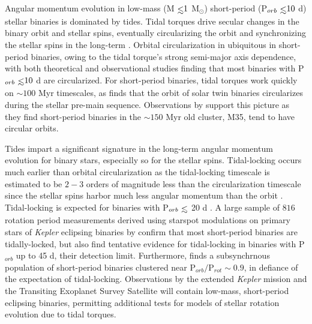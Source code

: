 \documentclass[twocolumn]{aastex61}
\def\lsim{~\rlap{$<$}{\lower 1.0ex\hbox{$\sim$}}}
\newcommand{\kepler}[0]{\textit{Kepler}\xspace}
\begin{document}
Angular momentum evolution in low-mass (M$\lsim 1$ M$_{\odot}$) short-period (P$_{orb} \lsim 10$ d) stellar binaries is dominated by tides.  Tidal torques drive secular changes in the binary orbit and stellar spins, eventually circularizing the orbit and synchronizing the stellar spins in the long-term \citep{Counselman1973}. Orbital circularization in ubiquitous in short-period binaries, owing to the tidal torque's strong semi-major axis dependence, with both theoretical \citep[e.g.][]{Zahn1989} and observational \citep[e.g.][]{Meibom2005,Mazeh2008,Lurie2017} studies finding that most binaries with P$_{orb} \lsim 10$ d are circularized. For short-period binaries, tidal torques work quickly on ${\sim}100$ Myr timescales, as \citet{Zahn1989} finds that the orbit of solar twin binaries circularizes during the stellar pre-main sequence.  Observations by \citet{Meibom2005} support this picture as they find short-period binaries in the ${\sim}150$ Myr old cluster, M35, tend to have circular orbits.

Tides impart a significant signature in the long-term angular momentum evolution for binary stars, especially so for the stellar spins. Tidal-locking occurs much earlier than orbital circularization as the tidal-locking timescale is estimated to be $2-3$ orders of magnitude less than the circularization timescale since the stellar spins harbor much less angular momentum than the orbit \citep{Zahn1989,Witte2002,Mazeh2008}. Tidal-locking is expected for binaries with P$_{orb} \lsim$ 20 d \citep[e.g.][]{Meibom2006,Mazeh2008,Zahn2008,Meibom2015}. A large sample of $816$ rotation period measurements derived using starspot modulations on primary stars of \kepler eclipsing binaries by \citet{Lurie2017} confirm that most short-period binaries are tidally-locked, but also find tentative evidence for tidal-locking in binaries with P$_{orb}$ up to 45 d, their detection limit. Furthermore, \citet{Lurie2017} finds a subsynchrnous population of short-period binaries clustered near P$_{orb}/$P$_{rot}{\sim} 0.9$, in defiance of the expectation of tidal-locking.  Observations by the extended \kepler mission \citep[K2,][]{Howell2014} and the Transiting Exoplanet Survey Satellite \citep[TESS, ][]{Ricker2014,Sullivan2015} will contain low-mass, short-period eclipsing binaries, permitting additional tests for models of stellar rotation evolution due to tidal torques.
 
\end{document}
